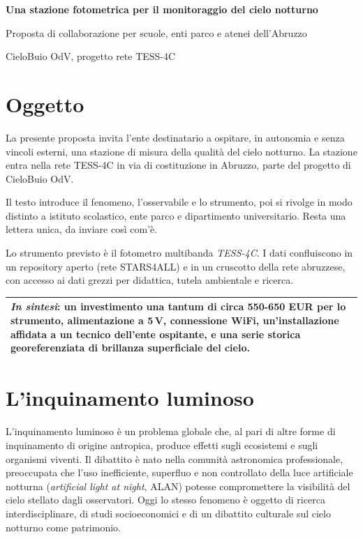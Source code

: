 \documentclass[11pt,a4paper]{report}
\newcommand{\infobox}[1]{%

  \begin{center}

  \renewcommand{\arraystretch}{1.5}

  \begin{tabularx}{\linewidth}{X}
    \arrayrulecolor{linegray}
    \toprule
    #1 \\
    \bottomrule
  \end{tabularx}

  \end{center}

}
\begin{document}
\begin{center}

{\LARGE\bfseries\color{nightblue} Una stazione fotometrica per il monitoraggio del cielo notturno\par}

\vspace{0.2cm}

{\large Proposta di collaborazione per scuole, enti parco e atenei dell'Abruzzo\par}

\vspace{0.1cm}

{\small CieloBuio OdV, progetto rete TESS-4C}

\end{center}

\section*{Oggetto}

La presente proposta invita l'ente destinatario a ospitare, in autonomia e senza vincoli esterni, una stazione di misura della qualità del cielo notturno. La stazione entra nella rete TESS-4C in via di costituzione in Abruzzo, parte del progetto di CieloBuio OdV.

Il testo introduce il fenomeno, l'osservabile e lo strumento, poi si rivolge in modo distinto a istituto scolastico, ente parco e dipartimento universitario. Resta una lettera unica, da inviare così com'è.

Lo strumento previsto è il fotometro multibanda \textit{TESS-4C}. I dati confluiscono in un repository aperto (rete STARS4ALL) e in un cruscotto della rete abruzzese, con accesso ai dati grezzi per didattica, tutela ambientale e ricerca.

\infobox{%
\textit{In sintesi}: un investimento una tantum di circa 550-650 EUR per lo strumento, alimentazione a 5\,V, connessione WiFi, un'installazione affidata a un tecnico dell'ente ospitante, e una serie storica georeferenziata di brillanza superficiale del cielo.
}

\section*{L'inquinamento luminoso}

L'inquinamento luminoso è un problema globale che, al pari di altre forme di inquinamento di origine antropica, produce effetti sugli ecosistemi e sugli organismi viventi. Il dibattito è nato nella comunità astronomica professionale, preoccupata che l'uso inefficiente, superfluo e non controllato della luce artificiale notturna (\textit{artificial light at night}, ALAN) potesse compromettere la visibilità del cielo stellato dagli osservatori. Oggi lo stesso fenomeno è oggetto di ricerca interdisciplinare, di studi socioeconomici e di un dibattito culturale sul cielo notturno come patrimonio.
\end{document}
